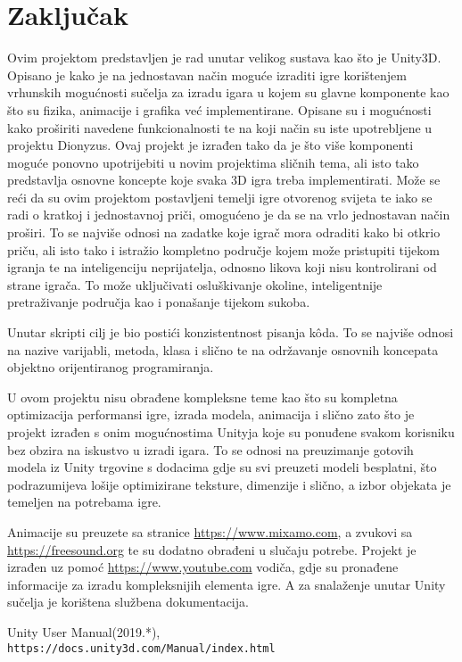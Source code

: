 \section{Zaključak}
Ovim projektom predstavljen je rad unutar velikog sustava kao što je Unity3D.
Opisano je kako je na jednostavan način moguće izraditi igre korištenjem vrhunskih
mogućnosti sučelja za izradu igara u kojem su glavne komponente kao što su fizika,
animacije i grafika već implementirane. Opisane su i mogućnosti kako proširiti
navedene funkcionalnosti te na koji način su iste upotrebljene u projektu Dionyzus.
Ovaj projekt je izrađen tako da je što više komponenti moguće ponovno upotrijebiti u
novim projektima sličnih tema, ali isto tako predstavlja osnovne koncepte koje svaka
3D igra treba implementirati. 
Može se reći da su ovim projektom postavljeni temelji igre otvorenog svijeta te iako
se radi o kratkoj i jednostavnoj priči, omogućeno je da se na vrlo jednostavan način
proširi. To se najviše odnosi na zadatke koje igrač mora odraditi kako bi otkrio
priču, ali isto tako i istražio kompletno područje kojem može pristupiti tijekom
igranja te na inteligenciju neprijatelja, odnosno likova koji nisu kontrolirani od
strane igrača. To može uključivati osluškivanje okoline, inteligentnije
pretraživanje područja kao i ponašanje tijekom sukoba.

Unutar skripti cilj je bio postići konzistentnost pisanja k\^oda. To se najviše
odnosi na nazive varijabli, metoda, klasa i slično te na održavanje osnovnih
koncepata objektno orijentiranog programiranja.

U ovom projektu nisu obrađene kompleksne teme kao što su kompletna optimizacija
performansi igre, izrada modela, animacija i slično zato što je projekt izrađen s
onim mogućnostima Unityja koje su ponuđene svakom korisniku bez obzira na iskustvo u
izradi igara. To se odnosi na preuzimanje gotovih modela iz Unity trgovine s
dodacima gdje su svi preuzeti modeli besplatni, što podrazumijeva lošije
optimizirane teksture, dimenzije i slično, a izbor objekata je temeljen na potrebama
igre.

Animacije su preuzete sa stranice \url{https://www.mixamo.com}, a
zvukovi sa \url{https://freesound.org} te su dodatno obrađeni u slučaju potrebe.
Projekt je izrađen uz pomoć \url{https://www.youtube.com} vodiča, gdje su pronađene
informacije za izradu kompleksnijih elementa igre. A za snalaženje unutar Unity
sučelja je korištena službena dokumentacija.
\begin{thebibliography}{9}
Unity User Manual(2019.*),
\\\texttt{https://docs.unity3d.com/Manual/index.html}
\end{thebibliography}